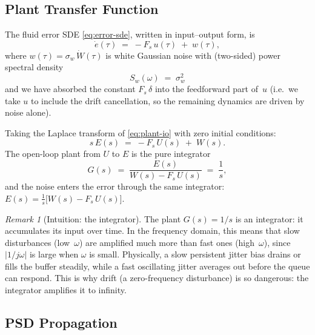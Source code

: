 \documentclass[11pt, a4paper]{article}
\theoremstyle{definition}
\theoremstyle{plain}
\theoremstyle{remark}
\newtheorem{remark}{Remark}[section]
\begin{document}
\subsection{Plant Transfer Function}\label{sec:plant-tf}

The fluid error SDE \eqref{eq:error-sde}, written in input--output
form, is
\begin{equation}\label{eq:plant-io}
  \dot{e}(\tau) \;=\; -F_s\,u(\tau) \;+\; w(\tau),
\end{equation}
where $w(\tau) = \sigma_w\,\dot{W}(\tau)$ is white Gaussian noise
with (two-sided) power spectral density
\begin{equation}\label{eq:psd-input}
  S_w(\omega) \;=\; \sigma_w^2
\end{equation}
and we have absorbed the constant $F_s\,\delta$ into the feedforward
part of~$u$ (i.e.\ we take $u$ to include the drift cancellation,
so the remaining dynamics are driven by noise alone).

Taking the Laplace transform of \eqref{eq:plant-io} with zero
initial conditions:
\begin{equation}\label{eq:plant-laplace}
  s\,E(s) \;=\; -F_s\,U(s) \;+\; W(s).
\end{equation}
The open-loop plant from $U$ to $E$ is the pure integrator
\begin{equation}\label{eq:plant-G}
  G(s) \;=\; \frac{E(s)}{W(s) - F_s\,U(s)}
       \;=\; \frac{1}{s},
\end{equation}
and the noise enters the error through the same integrator:
$E(s) = \frac{1}{s}\bigl[W(s) - F_s\,U(s)\bigr]$.

\begin{remark}[Intuition: the integrator]
  The plant $G(s) = 1/s$ is an integrator: it accumulates its input
  over time.  In the frequency domain, this means that slow
  disturbances (low~$\omega$) are amplified much more than fast ones
  (high~$\omega$), since $|1/j\omega|$ is large when $\omega$ is small.
  Physically, a slow persistent jitter bias drains or fills the buffer
  steadily, while a fast oscillating jitter averages out before the
  queue can respond.  This is why drift (a zero-frequency disturbance)
  is so dangerous: the integrator amplifies it to infinity.
\end{remark}

\subsection{PSD Propagation}\label{sec:psd-prop}
\end{document}
